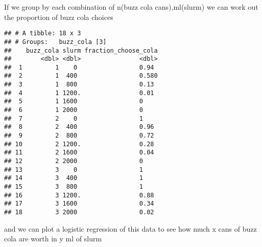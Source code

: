 \documentclass[]{article}
\newenvironment{Shaded}{\begin{snugshade}}{\end{snugshade}}
\newcommand{\KeywordTok}[1]{\textcolor[rgb]{0.13,0.29,0.53}{\textbf{#1}}}
\newcommand{\DataTypeTok}[1]{\textcolor[rgb]{0.13,0.29,0.53}{#1}}
\newcommand{\DecValTok}[1]{\textcolor[rgb]{0.00,0.00,0.81}{#1}}
\newcommand{\StringTok}[1]{\textcolor[rgb]{0.31,0.60,0.02}{#1}}
\newcommand{\CommentTok}[1]{\textcolor[rgb]{0.56,0.35,0.01}{\textit{#1}}}
\newcommand{\OperatorTok}[1]{\textcolor[rgb]{0.81,0.36,0.00}{\textbf{#1}}}
\newcommand{\NormalTok}[1]{#1}
\begin{document}
If we group by each combination of n(buzz cola cans),ml(slurm) we can
work out the proportion of buzz cola choices

\begin{Shaded}
\end{Shaded}

\begin{verbatim}
## # A tibble: 18 x 3
## # Groups:   buzz_cola [3]
##    buzz_cola slurm fraction_choose_cola
##        <dbl> <dbl>                <dbl>
##  1         1    0                 0.94 
##  2         1  400                 0.580
##  3         1  800                 0.13 
##  4         1 1200.                0.01 
##  5         1 1600                 0    
##  6         1 2000                 0    
##  7         2    0                 1    
##  8         2  400                 0.96 
##  9         2  800                 0.72 
## 10         2 1200.                0.28 
## 11         2 1600                 0.04 
## 12         2 2000                 0    
## 13         3    0                 1    
## 14         3  400                 1    
## 15         3  800                 1    
## 16         3 1200.                0.88 
## 17         3 1600                 0.34 
## 18         3 2000                 0.02
\end{verbatim}

and we can plot a logistic regression of this data to see how much x
cans of buzz cola are worth in y ml of slurm
\end{document}
